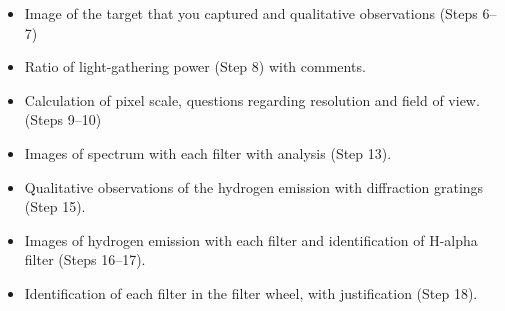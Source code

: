 \begin{itemize}
	
	\item Image of the target that you captured and qualitative observations (Steps 6--7)
	
	\item Ratio of light-gathering power (Step 8) with comments.
	
	\item Calculation of pixel scale, questions regarding resolution and field of view. (Steps 9--10)
	
	\item Images of spectrum with each filter with analysis (Step 13).
	
	\item Qualitative observations of the hydrogen emission with diffraction gratings (Step 15).
	
	\item Images of hydrogen emission with each filter and identification of H-alpha filter (Steps 16--17).
	
	\item Identification of each filter in the filter wheel, with justification (Step 18).
	
\end{itemize}